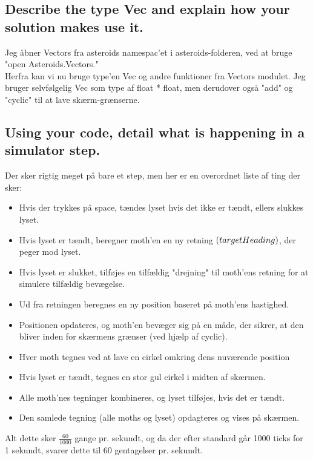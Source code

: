 \documentclass[a4paper,12pt]{article}
\begin{document}
\subsection{Describe the type Vec and explain how your solution makes use it.}
Jeg åbner Vectors fra asteroids namespac'et i asteroids-folderen, ved at bruge "open Asteroids.Vectors."\\
Herfra kan vi nu bruge type'en Vec og andre funktioner fra Vectors modulet. Jeg bruger selvfølgelig Vec som type af float * float, men derudover også "add" og "cyclic" til at lave skærm-grænserne.

\subsection{Using your code, detail what is happening in a simulator step. }
Der sker rigtig meget på bare et step, men her er en overordnet liste af ting der sker:
\begin{itemize}
    \item Hvis der trykkes på space, tændes lyset hvis det ikke er tændt, ellers slukkes lyset.
    \item Hvis lyset er tændt, beregner moth'en en ny retning $\left( targetHeading\right)$, der peger mod lyset.
    \item Hvis lyset er slukket, tilføjes en tilfældig "drejning" til moth'ens retning for at simulere tilfældig bevægelse.
    \item Ud fra retningen beregnes en ny position baseret på moth'ens hastighed.
    \item Positionen opdateres, og moth'en bevæger sig på en måde, der sikrer, at den bliver inden for skærmens grænser (ved hjælp af cyclic).
    \item Hver moth tegnes ved at lave en cirkel omkring dens nuværende position
    \item Hvis lyset er tændt, tegnes en stor gul cirkel i midten af skærmen.
    \item Alle moth'nes tegninger kombineres, og lyset tilføjes, hvis det er tændt.
    \item Den samlede tegning (alle moths og lyset) opdagteres og vises på skærmen.
\end{itemize}
Alt dette sker $\frac{60}{1000}$ gange pr. sekundt, og da der efter standard går 1000 ticks for 1 sekundt, svarer dette til 60 gentagelser pr. sekundt.
\end{document}
